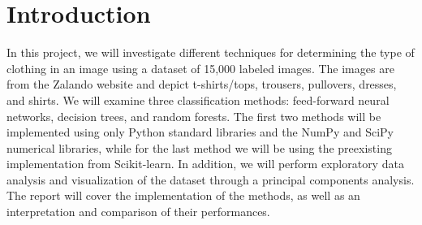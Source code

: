 \section{Introduction}
In this project, we will investigate different techniques for determining the type of clothing in an image using a dataset of 15,000 labeled images.
The images are from the Zalando website and depict t-shirts/tops, trousers, pullovers, dresses, and shirts.
We will examine three classification methods: feed-forward neural networks, decision trees, and random forests.
The first two methods will be implemented using only Python standard libraries and the NumPy and SciPy numerical libraries, while for the last method we will be using the preexisting implementation from Scikit-learn.
In addition, we will perform exploratory data analysis and visualization of the dataset through a principal components analysis.
The report will cover the implementation of the methods, as well as an interpretation and comparison of their performances.